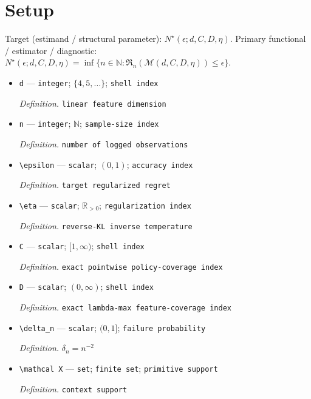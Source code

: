 \documentclass{article}
\begin{document}
\section{Setup}

Target (estimand / structural parameter): \(N^\star(\epsilon;d,C,D,\eta)\).
Primary functional / estimator / diagnostic: \(N^\star(\epsilon;d,C,D,\eta)=\inf\{n\in\mathbb N:\mathfrak R_n(\mathcal M(d,C,D,\eta))\le\epsilon\}\).
\begin{itemize}
  \item \texttt{d} --- \texttt{integer}; \(\{4,5,\ldots\}\); \texttt{shell index}
  \par\smallskip\noindent\emph{Definition.} \texttt{linear feature dimension}
  \item \texttt{n} --- \texttt{integer}; \(\mathbb N\); \texttt{sample-\allowbreak{}size index}
  \par\smallskip\noindent\emph{Definition.} \texttt{number of logged observations}
  \item \texttt{\textbackslash{}\allowbreak{}epsilon} --- \texttt{scalar}; \((0,1)\); \texttt{accuracy index}
  \par\smallskip\noindent\emph{Definition.} \texttt{target regularized regret}
  \item \texttt{\textbackslash{}\allowbreak{}eta} --- \texttt{scalar}; \(\mathbb R_{>0}\); \texttt{regularization index}
  \par\smallskip\noindent\emph{Definition.} \texttt{reverse-\allowbreak{}KL inverse temperature}
  \item \texttt{C} --- \texttt{scalar}; \([1,\infty)\); \texttt{shell index}
  \par\smallskip\noindent\emph{Definition.} \texttt{exact pointwise policy-\allowbreak{}coverage index}
  \item \texttt{D} --- \texttt{scalar}; \((0,\infty)\); \texttt{shell index}
  \par\smallskip\noindent\emph{Definition.} \texttt{exact lambda-\allowbreak{}max feature-\allowbreak{}coverage index}
  \item \texttt{\textbackslash{}\allowbreak{}delta\_\allowbreak{}n} --- \texttt{scalar}; \((0,1]\); \texttt{failure probability}
  \par\smallskip\noindent\emph{Definition.} \(\delta_n=n^{-2}\)
  \item \texttt{\textbackslash{}\allowbreak{}mathcal X} --- \texttt{set}; \texttt{finite set}; \texttt{primitive support}
  \par\smallskip\noindent\emph{Definition.} \texttt{context support}

\end{itemize}
\end{document}
